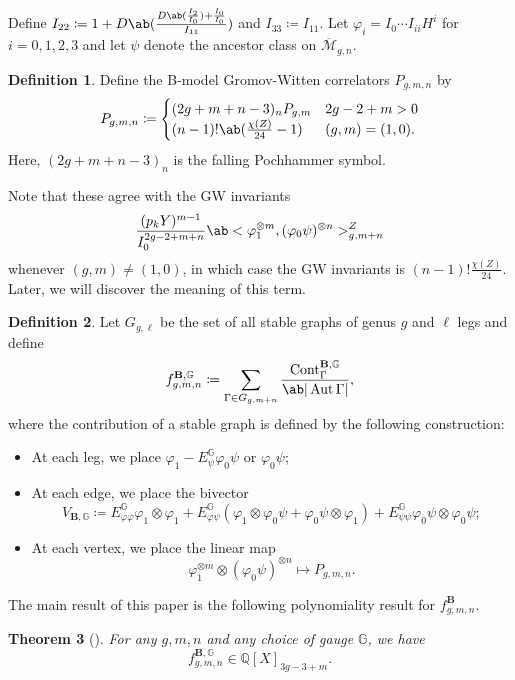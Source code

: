 \documentclass[10pt]{amsart}
\newtheorem{thm}{Theorem}[section]
\theoremstyle{definition}
\newtheorem{defn}[thm]{Definition}
\theoremstyle{remark}
\theoremstyle{plain}
\theoremstyle{definition}
\theoremstyle{remark}
\newcommand{\G}{\mathbb{G}}
\newcommand{\Q}{\mathbb{Q}}
\newcommand{\bB}{\mathbf{B}}
\newcommand{\msc}[1]{\mathscr{#1}}
\newcommand{\on}[1]{\operatorname{#1}}
\newcommand{\ol}[1]{\overline{#1}}
\newcommand{\1}{\mathbf{1}}
\newcommand{\2}{\mathbf{2}}
\newcommand{\3}{\mathbf{3}}
\DeclareMathOperator{\Aut}{Aut}
\numberwithin{equation}{section}
\begin{document}
Define $I_{22} \coloneqq 1 + D\ab(\frac{D\ab(\frac{I_2}{I_0}) + \frac{I_0}{I_0}}{I_{11}})$ and $I_{33} \coloneqq I_{11}$.
Let $\varphi_i = I_0 \cdots I_{ii} H^i$ for $i = 0,1,2,3$ and let $\psi$ denote the ancestor class on $\ol{\msc{M}}_{g,n}$.
\begin{defn}
    Define the B-model Gromov-Witten correlators $P_{g,m,n}$ by
    \[ P_{g,m,n} \coloneqq \begin{cases}
        (2g+m+n-3)_n P_{g,m} & 2g-2+m > 0 \\
        (n-1)! \ab(\frac{\chi(Z)}{24}-1) & (g,m) = (1,0).
    \end{cases}
    \]
    Here, $(2g+m+n-3)_n$ is the falling Pochhammer symbol.
\end{defn}

Note that these agree with the GW invariants
\[ \frac{(p_k Y)^{m-1}}{I_0^{2g-2+m+n}} \ab<\varphi_1^{\otimes m}, (\varphi_0\psi)^{\otimes n}>_{g,m+n}^Z \]
whenever $(g,m) \neq (1,0)$, in which case the GW invariants is $(n-1)! \frac{\chi(Z)}{24}$. Later, we will discover the meaning of this term.

\begin{defn}\label{defn:bmodelfeynman}
    Let $G_{g,\ell}$ be the set of all stable graphs of genus $g$ and $\ell$ legs and define
    \[ f_{g,m,n}^{\bB,\G} \coloneqq \sum_{\Gamma \in G_{g,m+n}} \frac{\on{Cont}_{\Gamma}^{\bB,\G}}{\ab|\Aut \Gamma|}, \]
    where the contribution of a stable graph is defined by the following construction:
    \begin{itemize}
        \item At each leg, we place $\varphi_1 - E_{\psi}^{\G}\varphi_0 \psi$ or $\varphi_0 \psi$;
        \item At each edge, we place the bivector
            \[ V_{\bB,\G} \coloneqq E_{\varphi\varphi}^{\G} \varphi_1 \otimes\varphi_1 + E_{\varphi\psi}^{\G} (\varphi_1\otimes \varphi_0\psi + \varphi_0\psi\otimes \varphi_1) + E_{\psi\psi}^{\G} \varphi_0\psi\otimes\varphi_0\psi; \]
        \item At each vertex, we place the linear map
            \[ \varphi_1^{\otimes m} \otimes (\varphi_0 \psi)^{\otimes n} \mapsto P_{g,m,n}. \]
    \end{itemize}
\end{defn}

The main result of this paper is the following polynomiality result for $f_{g,m,n}^{\bB}$.
\begin{thm}[]\label{thm:bmodelintro}
    For any $g,m,n$ and any choice of gauge $\G$, we have
    \[ f^{\bB,\G}_{g,m,n} \in \Q[X]_{3g-3+m}. \]
\end{thm}
\end{document}
